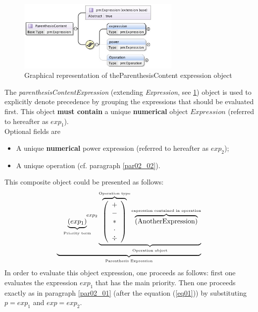 \documentclass[a4paper,11pt] {ivoa}
\begin{document}
\begin{figure}[htbp]
\begin{center}
\includegraphics[width=0.7\textwidth]{pictures/ParenthesisContent.jpg} 
\caption{Graphical representation of theParenthesisContent expression object}
\label{Pic-ParenthesisContent}
\end{center}
\end{figure}

The {\it parenthesisContentExpression} (extending {\it Expression}, see
\ref{Pic-ParenthesisContent}) object is used to explicitly denote precedence by grouping the
expressions that should be evaluated first. This object {\bf must contain} a unique {\bf numerical}
object $Expression$ (referred to hereafter as $exp_1$).\\
Optional fields are 
\begin{itemize}
\item A unique {\bf numerical} power expression (referred to hereafter as $exp_2$);
\item A unique operation (cf. paragraph \ref{par02_02}).\\
\end{itemize}
This composite object could be presented as follows:
\begin{equation}
 \underbrace{    \underbrace{ \left( exp_1\right) }_{\mbox{\tiny Priority term}} ^{\hspace{15mm}exp_2} \underbrace{  \overbrace{\left( \begin{array}{c} + \\ - \\ \ast  \\ \cdot \\ \div   \end{array} \right) }^{\mbox{\tiny Operation type}}
 \overbrace{    \left( \mbox{AnotherExpression}\right) }^{\mbox{\tiny expression contained in operation}}   }_{\mbox{\tiny Operation object}}}_{\mbox{\tiny Parenthesis Expression}}
\end{equation}
In order to evaluate this object expression, one proceeds as follows: first one evaluates the
expression $exp_1$ that has the main priority. Then one proceeds exactly as in paragraph
\ref{par02_01} (after the equation (\ref{eq01})) by substituting $p=exp_1$ and $exp=exp_2$.
\end{document}
